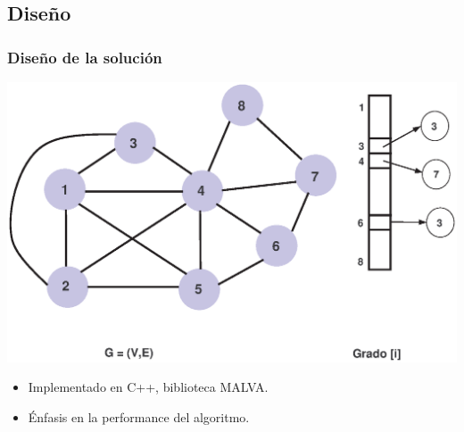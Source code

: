 \subsection{Diseño}
\begin{frame}\frametitle{Diseño de la solución}
\begin{center}
        \includegraphics[scale=0.35]{figuras/Solucion/chap5_fig1}
\end{center}
\begin{itemize}
 \item Implementado en C++, biblioteca MALVA.
 \item Énfasis en la performance del algoritmo.
\end{itemize} 
\end{frame}

